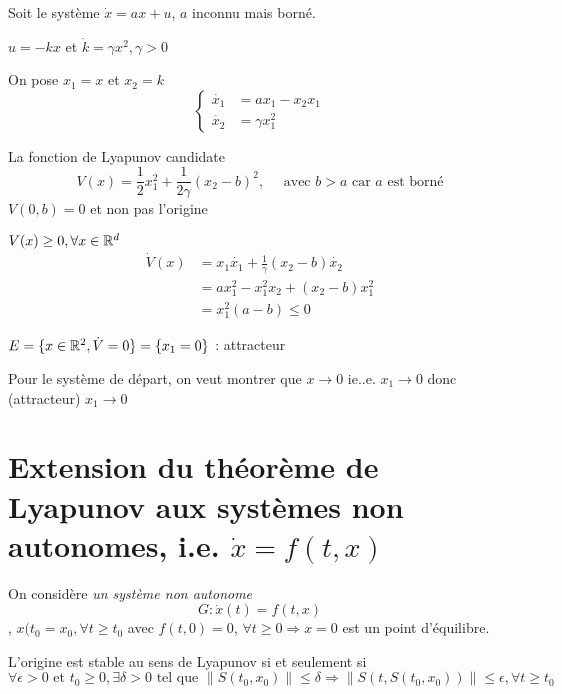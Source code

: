 \documentclass[main.tex]{subfiles} \newcommand{\D}{\mathcal{D}}
\begin{document}
\begin{exemple} Soit le système $\dot{x} = ax + u$, $a$
	inconnu mais borné.

  $u=-kx$ et $\dot{k}= \gamma x^2, \gamma >0$

  On pose $x_1=x$ et $x_2=k$ \[ \begin{cases} \dot{x_1} & = ax_1 - x_2x_1
  \\\dot{x_2}&  = \gamma x_1^2 \end{cases} \]

  La fonction de Lyapunov candidate \[ V(x) = \frac{1}{2} x_1^2 +
	\frac{1}{2\gamma} (x_2-b)^2, \quad \text{ avec } b>a \text{ car $a$ est
	borné} \] $V(0,b)=0$ et non pas l'origine

  $V(x) \geq 0, \forall x \in \mathbb{R}^d$ \begin{align*} \dot{V}(x) & = x_1 \dot{x_1}
  + \frac{1}{\gamma}(x_2-b)\dot{x_2} \\ & = ax_1^2 - x_1^2 x_2 + (x_2-b)x_1^2
  \\ & = x_1^2 (a-b) \leq 0 \end{align*}

  $E = \{ x \in \mathbb{R}^2, \dot{V}=0 \} = \{ x_1 = 0 \}$ : attracteur

  Pour le système de départ, on veut montrer que $x\to0$ ie..e. $x_1 \to 0$
donc (attracteur) $x_1 \to 0$ \end{exemple}

\section{Extension du théorème de Lyapunov aux systèmes non autonomes, i.e.
$\dot{x}=f(t,x)$}

\begin{defin} On considère \emph{un système non autonome} \[G : \dot{x}(t) =
	f(t,x)\], $x(t_0=x_0, \forall t\geq t_0$ avec $f(t,0)=0$, $\forall t \geq 0
	\Rightarrow x = 0$ est un point d'équilibre.

  L'origine est stable au sens de Lyapunov si et seulement si \[ \forall
	\epsilon > 0 \text{ et } t_0 \geq 0, \exists \delta > 0 \text{ tel que } \|
	S(t_0,x_0) \| \leq \delta \Rightarrow \| S(t,S(t_0,x_0)) \| \leq \epsilon,
	\forall t \geq t_0 \] \end{defin}
\end{document}
